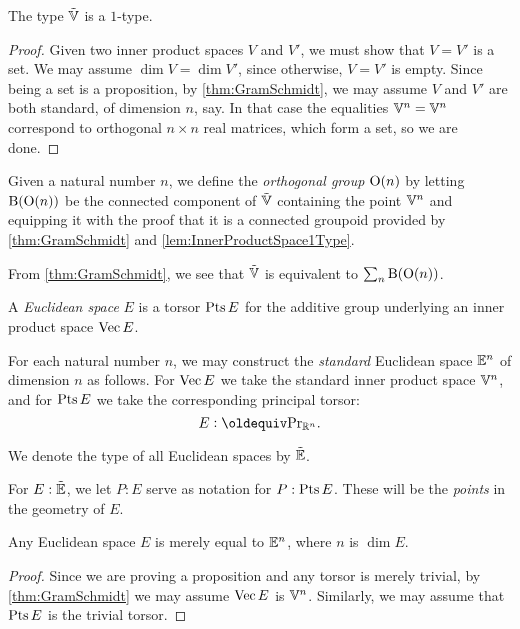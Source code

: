 \begin{lemma}\label{lem:InnerProductSpace1Type}
  The type ${\tilde {\mathbb V}}$ is a $1$-type.
\end{lemma}

\begin{proof}
  Given two inner product spaces $V$ and $V'$, we must show that $V=V'$ is a
  set.  We may assume $\dim V = \dim V'$, since otherwise, $V=V'$ is empty.
  Since being a set is a proposition, by \cref{thm:GramSchmidt}, we may assume
  $V$ and $V'$ are both standard, of dimension $n$, say.  In that case the
  equalities $\mathbb V^n = \mathbb V^n$ correspond to orthogonal $n \times n$ real
  matrices, which form a set, so we are done.
\end{proof}

\begin{definition}\label{def:OrthogonalGroup}
  Given a natural number $n$, we define the {\em orthogonal group} $\mathrm O(n)$
  by letting $\mathrm B (\mathrm O(n))$ be the connected component of ${\tilde {\mathbb V}}$ containing
  the point $\mathbb V^n$ and equipping it with the proof that it is a connected
  groupoid provided by \cref{thm:GramSchmidt} and
  \cref{lem:InnerProductSpace1Type}.
\end{definition}

From \cref{thm:GramSchmidt}, we see that ${\tilde {\mathbb V}}$ is equivalent to 
$\sum_n \mathrm B (\mathrm O(n))$.

\begin{definition}\label{def:EuclideanSpace}
  A {\em Euclidean space} $E$ is a torsor $\operatorname{Pts} E$ for the additive group
  underlying an inner product space $\operatorname{Vec} E$.
\end{definition}

For each natural number $n$, we may construct the {\em standard} Euclidean
space $\mathbb E^n$ of dimension $n$ as follows.  For $\operatorname{Vec} E$ we take the
standard inner product space $\mathbb V^n$, and for $\operatorname{Pts} E$ we take the
corresponding principal torsor:
$$ E \defeq \princ {\RR^n}. $$

We denote the type of all Euclidean spaces by ${\tilde {\mathbb E}}$.

For $E:{\tilde {\mathbb E}}$, we let $P:E$ serve as notation for $P:\operatorname{Pts} E$.  These will be
the {\em points} in the geometry of $E$.

\begin{theorem}\label{thm:EuclideanNormalization}
  Any Euclidean space $E$ is merely equal to $\mathbb E^n$, where $n$ is $\dim E$.
\end{theorem}

\begin{proof}
  Since we are proving a proposition and any torsor is merely trivial, by
  \cref{thm:GramSchmidt} we may assume $\operatorname{Vec} E$ is $\mathbb V^n$.  Similarly, we
  may assume that $\operatorname{Pts} E$ is the trivial torsor.
\end{proof}

